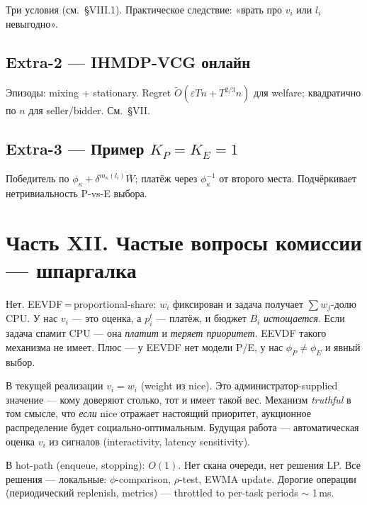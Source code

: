 \documentclass[11pt,a4paper]{article}
\begin{document}
Три условия (см.\ §VIII.1). Практическое следствие: «врать про
$v_i$ или $l_i$ невыгодно».

\subsection*{Extra-2 — IHMDP-VCG онлайн}

Эпизоды: mixing + stationary. Regret $\tilde O(\varepsilon T n + T^{2/3}n)$
для welfare; квадратично по $n$ для seller/bidder. См.\ §VII.

\subsection*{Extra-3 — Пример $K_P=K_E=1$}

Победитель по $\phi_\kappa+\delta^{m_\kappa(l_i)}\bar W$; платёж через
$\phi^{-1}_\kappa$ от второго места. Подчёркивает нетривиальность
P-vs-E выбора.

\clearpage
\section{Часть XII. Частые вопросы комиссии — шпаргалка}

\begin{ask}
Нет. EEVDF\,=\,proportional-share: $w_i$ фиксирован и задача получает
$\sum w_j$-долю CPU. У нас $v_i$ — это оценка, а $p_i^t$ — платёж, и
бюджет $B_i$ \emph{истощается}. Если задача спамит CPU — она
\emph{платит} и \emph{теряет приоритет}. EEVDF такого механизма не
имеет. Плюс — у EEVDF нет модели P/E, у нас $\phi_P\neq\phi_E$ и
явный выбор.
\end{ask}

\begin{ask}
В текущей реализации $v_i = w_i$ (weight из nice). Это администратор-supplied
значение — кому доверяют столько, тот и имеет такой вес. Механизм
\emph{truthful} в том смысле, что \emph{если} nice отражает настоящий
приоритет, аукционное распределение будет социально-оптимальным.
Будущая работа — автоматическая оценка $v_i$ из сигналов (interactivity,
latency sensitivity).
\end{ask}

\begin{ask}
В hot-path (enqueue, stopping): $O(1)$. Нет скана очереди, нет
решения LP. Все решения — локальные: $\phi$-comparison, $\rho$-test,
EWMA update. Дорогие операции (периодический replenish, metrics) —
throttled to per-task periods $\sim$ 1\,ms.
\end{ask}
\end{document}
